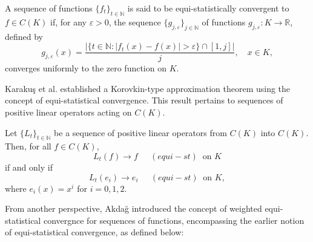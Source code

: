 \documentclass[reqno]{amsart}
\begin{document}
\begin{definition}\cite[Page no. 719]{balcerzak2007statistical}
A sequence of functions $\{f_t\}_{t \in \mathbb{N}}$ is said to be equi-statistically convergent to $f \in C(K)$ if, for any $\varepsilon > 0$, the sequence $\{g_{j,\varepsilon}\}_{j \in \mathbb{N}}$ of functions $g_{j,\varepsilon} : K \to \mathbb{R}$, defined by
\begin{equation*}
	g_{j,\varepsilon}(x) = \frac{|\{t \in \mathbb{N} : |f_t(x) - f(x)| > \varepsilon\} \cap [1,j]|}{j}, \quad x \in K,
\end{equation*}
converges uniformly to the zero function on $K$.
\end{definition}
Karakuş et al. \cite{karakucs2008equi} established a Korovkin-type approximation theorem using the concept of equi-statistical convergence. This result pertains to sequences of positive linear operators acting on $C(K)$.
\begin{theorem}\cite[Theorem 2.4]{karakucs2008equi}\label{equistcon}
	Let $\{L_t\}_{t\in\mathbb{N}}$ be a sequence of positive linear operators from $C(K)$ into $C(K)$. Then, for all $f \in C(K)$,
	$$
	L_t(f) \to f ~~\quad(equi-st ) ~\text{ on } K
	$$
	if and only if
	\begin{equation*}
		L_t(e_i) \to e_i ~~\quad(equi-st )~ \text{ on } K,
	\end{equation*}
	where $e_i(x) = x^i$ for $i = 0, 1, 2$. 
\end{theorem}
From another perspective, Akda{\u{g}} \cite{akdaug2017weighted} introduced the concept of weighted equi-statistical convergnce for sequences of functions, encompassing the earlier notion of equi-statistical convergence, as defined below: 
\end{document}
